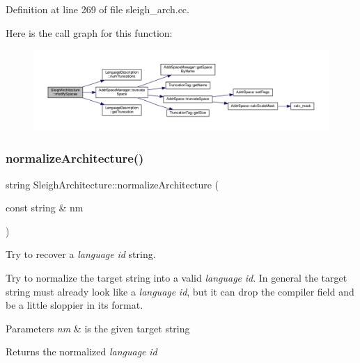Definition at line 269 of file sleigh\+\_\+arch.\+cc.

Here is the call graph for this function\+:
\nopagebreak
\begin{figure}[H]
\begin{center}
\leavevmode
\includegraphics[width=350pt]{class_sleigh_architecture_aaf0c0ad5b1160d42fecce0a27ce05674_cgraph}
\end{center}
\end{figure}
\mbox{\label{class_sleigh_architecture_a8053081371771a941248809754fc836f}} 
\subsubsection{\texorpdfstring{normalizeArchitecture()}{normalizeArchitecture()}}
{\footnotesize\ttfamily string Sleigh\+Architecture\+::normalize\+Architecture (\begin{DoxyParamCaption}\item[{const string \&}]{nm }\end{DoxyParamCaption})\hspace{0.3cm}{\ttfamily [static]}}



Try to recover a {\itshape language} {\itshape id} string. 

Try to normalize the target string into a valid {\itshape language} {\itshape id}. In general the target string must already look like a {\itshape language} {\itshape id}, but it can drop the compiler field and be a little sloppier in its format. 
\begin{DoxyParams}{Parameters}
{\em nm} & is the given target string \\
\hline
\end{DoxyParams}
\begin{DoxyReturn}{Returns}
the normalized {\itshape language} {\itshape id} 
\end{DoxyReturn}


